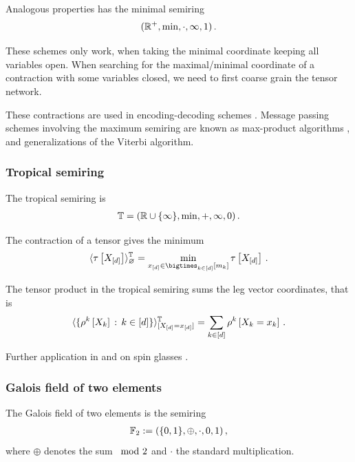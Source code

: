 Analogous properties has the minimal semiring
\begin{align*}
    (\mathbb{R}^+,\mathrm{min},\cdot,\infty,1) \, .
\end{align*}


These schemes only work, when taking the minimal coordinate keeping all variables open.
When searching for the maximal/minimal coordinate of a contraction with some variables closed, we need to first coarse grain the tensor network.

These contractions are used in encoding-decoding schemes \cite{mezard_information_2009,mackay_information_2003}.
Message passing schemes involving the maximum semiring are known as max-product algorithms \cite{koller_probabilistic_2009}, and generalizations of the Viterbi algorithm.

\subsubsection{Tropical semiring}

The tropical semiring is
\begin{align*}
    \mathbb{T}
    = (\mathbb{R}\cup\{\infty\},\mathrm{min},+,\infty,0) \, .
\end{align*}

The contraction of a tensor gives the minimum
\begin{align*}
    \srcontractionwrt{\hypercorewith}{\tropicalsemiring}
    = \min_{\shortcatindicesin} \hypercoreat{\shortcatvariables} \, .
\end{align*}

The tensor product in the tropical semiring sums the leg vector coordinates, that is
\begin{align*}
    \langle
        \{\rho^{k}\left[X_{k}\right] \,:\, k\in[d]\}
    \rangle^{\mathbb{T}}_{[X_{[d]}=x_{[d]}]}
    = \sum_{k\in[d]} \rho^{k}\left[X_{k}=x_{k}\right] \, .
\end{align*}

Further application in \cite{hu_tropical_2026} and on spin glasses \cite{liu_tropical_2021}.

\subsubsection{Galois field of two elements}\label{sec:semiringGalois}

The Galois field of two elements is the semiring
\begin{align*}
    \mathbb{F}_2
    := (\{0,1\},\oplus,\cdot,0,1) \, ,
\end{align*}
where $\oplus$ denotes the sum $\,\,\,\mathrm{mod}\,\, 2$ and $\cdot$ the standard multiplication.


